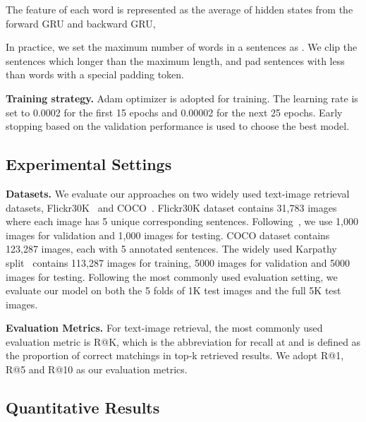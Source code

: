 \documentclass[10pt,twocolumn,letterpaper]{article}
\begin{document}
\vspace{-2pt}
The feature of each word is represented as the average of hidden states from the forward GRU and backward GRU,
\vspace{-2pt}

In practice, we set the maximum number of words in a sentences as . We clip the sentences which longer than the maximum length, and pad sentences with less than  words with a special padding token. 
	


\noindent\textbf{Training strategy.}
Adam optimizer is adopted for training. The learning rate is set to 0.0002 for the first 15 epochs and 0.00002 for the next 25 epochs. Early stopping based on the validation performance is used to choose the best model.

\subsection{Experimental Settings}
\label{sec:expsetting}

\noindent\textbf{Datasets.}
We evaluate our approaches on two widely used text-image retrieval datasets, Flickr30K~\cite{young2014image} and COCO~\cite{lin2014microsoft}.  
Flickr30K dataset contains 31,783 images where each image has 5 unique corresponding sentences. Following~\cite{karpathy2015deep,faghri2017vse++}, we use 1,000 images for validation and 1,000 images for testing.
COCO dataset contains 123,287 images, each with 5 annotated sentences. The widely used Karpathy split~\cite{karpathy2015deep} contains 113,287 images for training, 5000 images for validation and 5000 images for testing. Following the most commonly used evaluation setting, we evaluate our model on both the 5 folds of 1K test images and the full 5K test images.

\noindent\textbf{Evaluation Metrics.}
For text-image retrieval, the most commonly used evaluation metric is {\rm R@K}, which is the abbreviation for recall at  and is defined as the proportion of correct matchings in top-k retrieved results.
We adopt {\rm R@1, R@5} and {\rm R@10} as our evaluation metrics.


\subsection{Quantitative Results}
\label{sec:quantresult}
\end{document}
